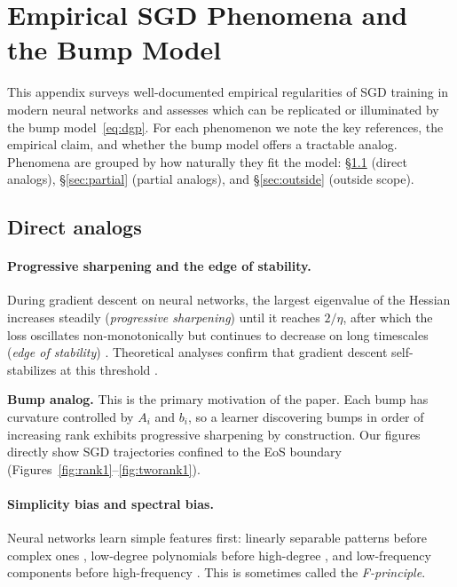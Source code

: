 \documentclass{article}
\begin{document}
\appendix

\section{Empirical SGD Phenomena and the Bump Model}

This appendix surveys well-documented empirical regularities of SGD
training in modern neural networks and assesses which can be replicated
or illuminated by the bump model~\eqref{eq:dgp}. For each phenomenon we
note the key references, the empirical claim, and whether the bump model
offers a tractable analog. Phenomena are grouped by how naturally they
fit the model: \S\ref{sec:direct} (direct analogs),
\S\ref{sec:partial} (partial analogs), and \S\ref{sec:outside}
(outside scope).

\subsection{Direct analogs}\label{sec:direct}

\paragraph{Progressive sharpening and the edge of stability.}
During gradient descent on neural networks, the largest eigenvalue of
the Hessian increases steadily (\emph{progressive sharpening}) until it
reaches $2/\eta$, after which the loss oscillates non-monotonically but
continues to decrease on long timescales (\emph{edge of stability})
\cite{cohen2021gradient}. Theoretical analyses confirm that gradient
descent self-stabilizes at this threshold
\cite{arora2022understanding,damian2023selfstabilization}.

\textbf{Bump analog.} This is the primary motivation of the paper. Each
bump has curvature controlled by $A_i$ and $b_i$, so a learner
discovering bumps in order of increasing rank exhibits progressive
sharpening by construction. Our figures directly show SGD trajectories
confined to the EoS boundary (Figures~\ref{fig:rank1}--\ref{fig:tworank1}).

\paragraph{Simplicity bias and spectral bias.}
Neural networks learn simple features first: linearly separable
patterns before complex ones \cite{shah2020simplicity}, low-degree
polynomials before high-degree \cite{kalimeris2019sgd}, and
low-frequency components before high-frequency
\cite{rahaman2019spectral}. This is sometimes called the
\emph{F-principle}.
\end{document}
